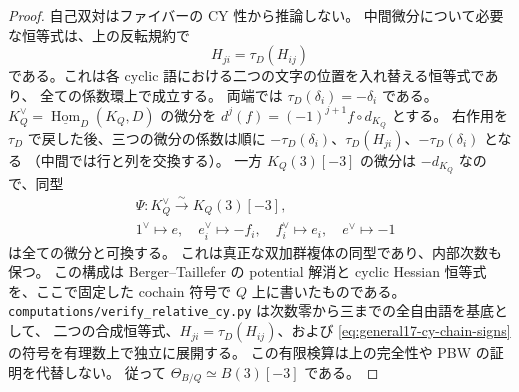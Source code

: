 \begin{proof}
自己双対はファイバーの CY 性から推論しない。
中間微分について必要な恒等式は、上の反転規約で
\[
 H_{ji}=\tau_D(H_{ij})
\]
である。これは各 cyclic 語における二つの文字の位置を入れ替える恒等式であり、
全ての係数環上で成立する。
両端では $\tau_D(\delta_i)=-\delta_i$ である。
$K_Q^\vee=\underline{\operatorname{Hom}}_D(K_Q,D)$ の微分を
$d^j(f)=(-1)^{j+1}f\circ d_{K_Q}$ とする。
右作用を $\tau_D$ で戻した後、三つの微分の係数は順に
$-\tau_D(\delta_i)$、$\tau_D(H_{ji})$、$-\tau_D(\delta_i)$ となる
（中間では行と列を交換する）。
一方 $K_Q(3)[-3]$ の微分は $-d_{K_Q}$ なので、同型
\begin{equation}\label{eq:general17-cy-chain-signs}
 \begin{aligned}
 &\Psi:K_Q^\vee\xrightarrow{\sim}K_Q(3)[-3],\\
 &1^\vee\mapsto e,\quad e_i^\vee\mapsto-f_i,\quad
 f_i^\vee\mapsto e_i,\quad e^\vee\mapsto-1
 \end{aligned}
\end{equation}
は全ての微分と可換する。
これは真正な双加群複体の同型であり、内部次数も保つ。
この構成は Berger--Taillefer \cite[arXiv v2, Theorem~3.6 の証明, pp.~9--12]{BT} の
potential 解消と cyclic Hessian 恒等式を、ここで固定した cochain 符号で
$Q$ 上に書いたものである。
\nolinkurl{computations/verify_relative_cy.py} は次数零から三までの全自由語を基底として、
二つの合成恒等式、$H_{ji}=\tau_D(H_{ij})$、および
\eqref{eq:general17-cy-chain-signs} の符号を有理数上で独立に展開する。
この有限検算は上の完全性や PBW の証明を代替しない。
従って $\Theta_{B/Q}\simeq B(3)[-3]$ である。


\end{proof}
